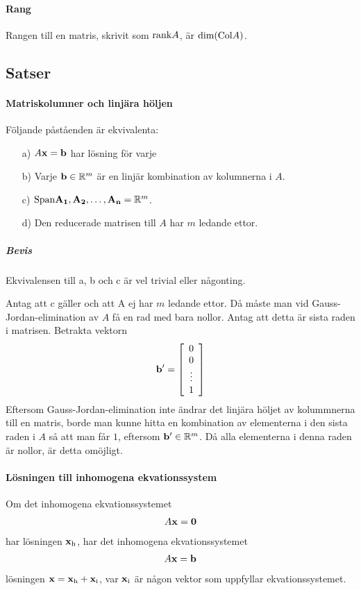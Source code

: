 \paragraph{Rang}
Rangen till en matris, skrivit som $\text{rank} A$, är $\text{dim}(\text{Col} A)$.

\subsection{Satser}

\paragraph{Matriskolumner och linjära höljen}
Följande påståenden är ekvivalenta:
\begin{itemize}
	\item[a)] $A\vectorbold{x} = \vect{b}$ har lösning för varje
	\item[b)] Varje $\vect{b}\in \R^{m}$ är en linjär kombination av kolumnerna i $A$.
	\item[c)] $\Span{\vect{A_1}, \vect{A_2}, \dots, \vect{A_n}} = \R^m$.
	\item[d)] Den reducerade matrisen till $A$ har $m$ ledande ettor.
\end{itemize}

\subparagraph{Bevis}
Ekvivalensen till a, b och c är vel trivial eller någonting.

Antag att c gäller och att A ej har $m$ ledande ettor. Då måste man vid Gauss-Jordan-elimination av $A$ få en rad med bara nollor. Antag att detta är sista raden i matrisen. Betrakta vektorn
\begin{align*}
	\vect{b}' =
	\left[\begin{array}{c}
    	0    \\
    	0    \\
    	\vdots \\
	    1
	\end{array}\right]
\end{align*}
Eftersom Gauss-Jordan-elimination inte ändrar det linjära höljet av kolummnerna till en matris, borde man kunne hitta en kombination av elementerna i den sista raden i $A$ så att man får $1$, eftersom $\vect{b}'\in\R^m$. Då alla elementerna i denna raden är nollor, är detta omöjligt.

\paragraph{Lösningen till inhomogena ekvationssystem}
Om det inhomogena ekvationssystemet
\begin{align*}
	A\vect{x} = \vect{0}
\end{align*}
har lösningen $\vect{x}_\text{h}$, har det inhomogena ekvationssystemet
\begin{align*}
	A\vect{x} = \vect{b}
\end{align*}
lösningen $\vect{x} = \vect{x}_\text{h} + \vect{x}_\text{i}$, var $\vect{x}_\text{i}$ är någon vektor som uppfyllar ekvationssystemet.

